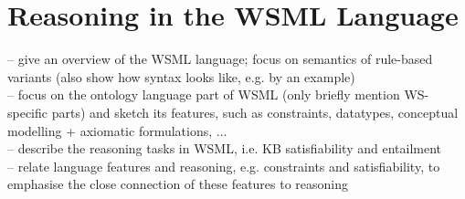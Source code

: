 \section{Reasoning in the WSML Language\label{sec:wsml}}
-- give an overview of the WSML language; focus on semantics of rule-based variants (also show how syntax looks like, e.g. by an example) \\
-- focus on the ontology language part of WSML (only briefly mention WS-specific parts) and sketch its features, such as constraints, datatypes, conceptual modelling + axiomatic formulations, ... \\
-- describe the reasoning tasks in WSML, i.e. KB satisfiability and entailment \\
-- relate language features and reasoning, e.g. constraints and satisfiability, to emphasise the close connection of these features to reasoning \\
